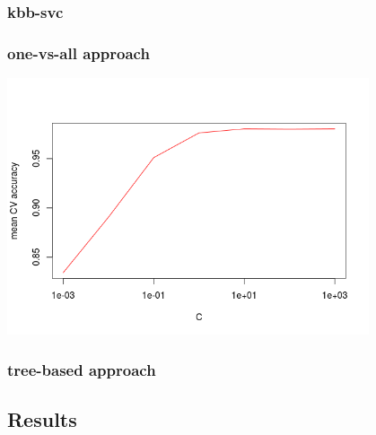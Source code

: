 \subsubsection{kbb-svc}

\subsubsection{one-vs-all approach}

\includegraphics[width=0.8\textwidth]{../plots/one_vs_all_zip}

\subsubsection{tree-based approach}


\subsection{Results}